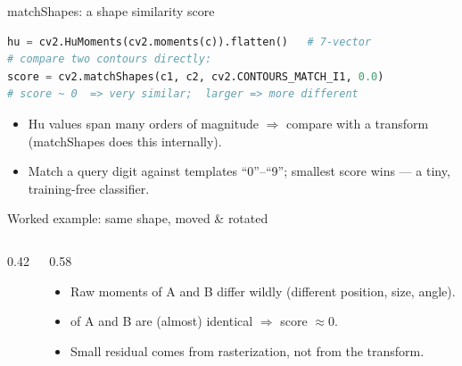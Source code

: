 \documentclass[10pt,aspectratio=169]{beamer}
\begin{document}
\begin{frame}[fragile]{matchShapes: a shape similarity score}
\begin{lstlisting}[language=Python]
hu = cv2.HuMoments(cv2.moments(c)).flatten()   # 7-vector
# compare two contours directly:
score = cv2.matchShapes(c1, c2, cv2.CONTOURS_MATCH_I1, 0.0)
# score ~ 0  => very similar;  larger => more different
\end{lstlisting}
  \begin{itemize}
    \item Hu values span many orders of magnitude $\Rightarrow$ compare with a  transform (matchShapes does this internally).
    \item Match a query digit against templates ``0''--``9''; smallest score wins — a tiny, training-free classifier.
  \end{itemize}
\end{frame}

\begin{frame}{Worked example: same shape, moved \& rotated}
  \begin{columns}[T]
    \begin{column}{0.42\textwidth}
    \begin{center}
    \end{center}
    \end{column}
    \begin{column}{0.58\textwidth}
      \begin{itemize}\scriptsize
        \item Raw moments of A and B differ wildly (different position, size, angle).
        \item {} of A and B are (almost) identical $\Rightarrow$  score $\approx 0$.
        \item Small residual comes from rasterization, not from the transform.
      \end{itemize}
    \end{column}
  \end{columns}
\end{frame}
\end{document}
